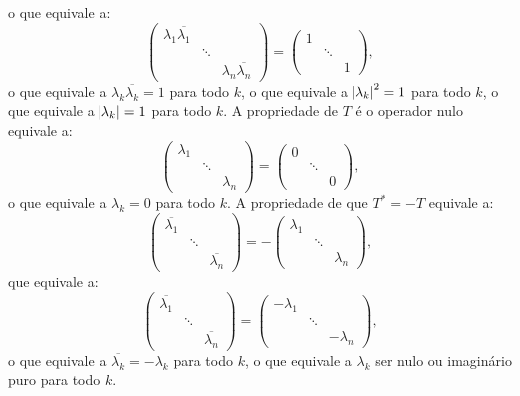 \documentclass[11pt,a4paper]{article}
\begin{document}
{{\[\]
o que equivale a:
\[
\begin{pmatrix}
\lambda_1\overline{\lambda_1}&&\\&\ddots&\\&&\lambda_n\overline{\lambda_n}
\end{pmatrix}=\begin{pmatrix}
1&&\\&\ddots&\\&&1
\end{pmatrix},
\]
o que equivale a $\lambda_k\overline{\lambda_k}=1$ para todo $k$, o que equivale a $\abs{\lambda_k}^2=1$ para todo $k$, o que equivale a $\abs{\lambda_k}=1$ para todo $k$.
\task[\pers{c}] A propriedade de $T$ é o operador nulo equivale a:
\[
\begin{pmatrix}
\lambda_1&&\\&\ddots&\\&&\lambda_n
\end{pmatrix}=\begin{pmatrix}
0&&\\&\ddots&\\&&0
\end{pmatrix},
\]
o que equivale a $\lambda_k=0$ para todo $k$.
\task[\pers{d}] A propriedade de que $T^*=-T$ equivale a:
\[
\begin{pmatrix}
\overline{\lambda_1}&&\\&\ddots&\\&&\overline{\lambda_n}
\end{pmatrix}=-\begin{pmatrix}
\lambda_1&&\\&\ddots&\\&&\lambda_n
\end{pmatrix},
\]
que equivale a:
\[
\begin{pmatrix}
\overline{\lambda_1}&&\\&\ddots&\\&&\overline{\lambda_n}
\end{pmatrix}=\begin{pmatrix}
-\lambda_1&&\\&\ddots&\\&&-\lambda_n
\end{pmatrix},
\]
o que equivale a $\overline{\lambda_k}=-\lambda_k$ para todo $k$, o que equivale a $\lambda_k$ ser nulo ou imaginário puro para todo $k$.
}
}
\end{document}
